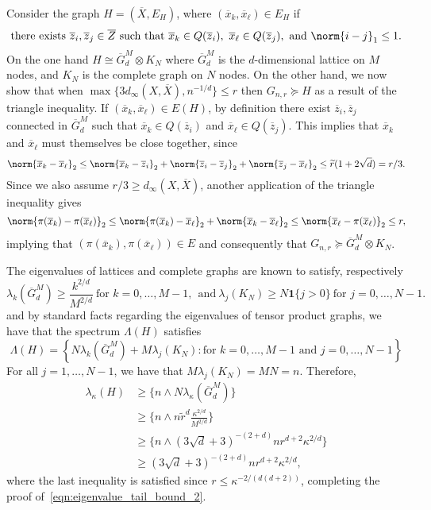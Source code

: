 \documentclass{article}
\newcommand{\set}[1]{\left\{#1\right\}}
\newcommand{\1}{\mathbf{1}}
\newcommand{\wt}[1]{\widetilde{#1}}
\newcommand{\ol}[1]{\overline{#1}}
\theoremstyle{alden}
\theoremstyle{aldenthm}
\theoremstyle{definition}
\theoremstyle{remark}
\begin{document}
Consider the graph $H = (\overline{X}, E_H)$, where $(\ol{x}_k, \ol{x}_{\ell}) \in E_H$ if
\begin{equation*}
\textrm{there exists}~\ol{z}_i, \ol{z}_j \in \ol{Z}~\textrm{such that}~\ol{x}_k \in Q(\ol{z}_i),~ \ol{x}_\ell \in Q(\ol{z}_j),~\textrm{and}~\norm{i - j}_1 \leq 1.
\end{equation*}
On the one hand $H \cong \ol{G}^M_d \otimes K_N$ where $\ol{G}^M_d$ is the $d$-dimensional lattice on $M$ nodes, and $K_N$ is the complete graph on $N$ nodes. On the other hand, we now show that when $\max\{3d_{\infty}(X,\ol{X}), n^{-1/d}\} \leq r$ then $G_{n,r} \succeq H$ as a result of the triangle inequality. If $(\ol{x}_k, \ol{x}_{\ell}) \in E(H)$, by definition there exist $\ol{z}_i, \ol{z}_j$ connected in $\ol{G}_d^M$ such that $\ol{x}_k \in Q(\ol{z}_i)$ and $\ol{x}_{\ell} \in Q(\ol{z}_j)$. This implies that $\ol{x}_k$ and $\ol{x}_{\ell}$ must themselves be close together, since
\begin{equation*}
\norm{\ol{x}_k - \ol{x}_{\ell}}_2 \leq \norm{\ol{x}_k - \ol{z}_{i}}_2 + \norm{\ol{z}_i - \ol{z}_j}_2 +  \norm{\ol{z}_{j} - \ol{x}_{\ell} }_2 \leq \wt{r}(1 + 2\sqrt{d}) = r/3.
\end{equation*}
Since we also assume $r/3 \geq d_{\infty}(X,\ol{X})$, another application of the triangle inequality gives
\begin{equation*}
\norm{\pi(\ol{x}_k) - \pi(\ol{x}_\ell)}_2 \leq \norm{\pi(\ol{x}_k) - \ol{x}_\ell}_2 + \norm{\ol{x}_k - \ol{x}_\ell}_2 \leq \norm{\ol{x}_{\ell} - \pi(\ol{x}_\ell)}_2 \leq r,
\end{equation*}
implying that $(\pi(\ol{x}_k), \pi(\ol{x}_{\ell})) \in E$ and consequently that $G_{n,r} \succeq \ol{G}^M_d \otimes K_N$.

The eigenvalues of lattices and complete graphs are known to satisfy, respectively
\begin{equation*}
\lambda_k(\ol{G}^{M}_d) \geq \frac{k^{2/d}}{M^{2/d}}~\textrm{for $k = 0,\ldots,M - 1$},~~ \textrm{and}~\lambda_{j}(K_N) \geq N\1\{j > 0\}~\textrm{for $j = 0,\ldots,N-1$.}
\end{equation*}
and by standard facts regarding the eigenvalues of tensor product graphs, we have that the spectrum $\Lambda(H)$ satisfies
\begin{equation*}
\Lambda(H) = \set{N\lambda_k(\ol{G}^{M}_d) + M\lambda_j(K_N): \textrm{for $k = 0,\ldots,M - 1$ and $j = 0,\ldots,N-1$}}
\end{equation*}
For all $j = 1,\ldots,N-1$, we have that $M\lambda_j(K_N) = MN = n$. Therefore,
\begin{align*}
\lambda_{\kappa}(H) & \geq \{n \wedge N\lambda_{\kappa}(\ol{G}^{M}_d)\} \\
& \geq \{n \wedge n\wt{r}^d\frac{\kappa^{2/d}}{M^{2/d}}\} \\
& \geq \{n \wedge (3\sqrt{d} + 3)^{-(2+d)}nr^{d+2}\kappa^{2/d}\} \\
& \geq (3\sqrt{d} + 3)^{-(2+d)}nr^{d+2}\kappa^{2/d},
\end{align*}
where the last inequality is satisfied since $r \leq \kappa^{-2/(d(d + 2))}$, completing the proof of~\eqref{eqn:eigenvalue_tail_bound_2}.
\end{document}

